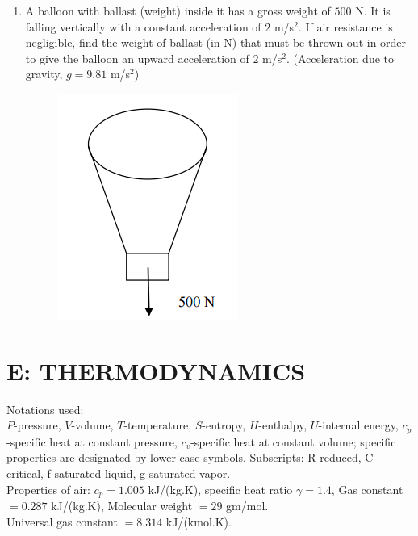 \documentclass[a4paper,10pt]{article}
\begin{document}
\begin{enumerate}
    \hfill{}
    \begin{enumerate}[label=\Alph*)]
    \end{enumerate}
    
    \item A balloon with ballast (weight) inside it has a gross weight of $500$ N. It is falling vertically with a constant acceleration of $2$ m/s$^2$. If air resistance is negligible, find the weight of ballast (in N) that must be thrown out in order to give the balloon an upward acceleration of $2$ m/s$^2$. (Acceleration due to gravity, $g = 9.81$ m/s$^2$)
    \begin{figure}[H] \centering \includegraphics[width=0.3\columnwidth]{q22_solid.png} \caption*{} \label{fig:q22_solid} \end{figure}
    
    \hfill{}
\end{enumerate}
\clearpage

\section*{E: THERMODYNAMICS}
Notations used: \\
$P$-pressure, $V$-volume, $T$-temperature, $S$-entropy, $H$-enthalpy, $U$-internal energy, $c_p$-specific heat at constant pressure, $c_v$-specific heat at constant volume; specific properties are designated by lower case symbols.
Subscripts: R-reduced, C-critical, f-saturated liquid, g-saturated vapor. \\
Properties of air: $c_p = 1.005$ kJ/(kg.K), specific heat ratio $\gamma = 1.4$, Gas constant $= 0.287$ kJ/(kg.K), Molecular weight $= 29$ gm/mol. \\
Universal gas constant $= 8.314$ kJ/(kmol.K).
\end{document}
